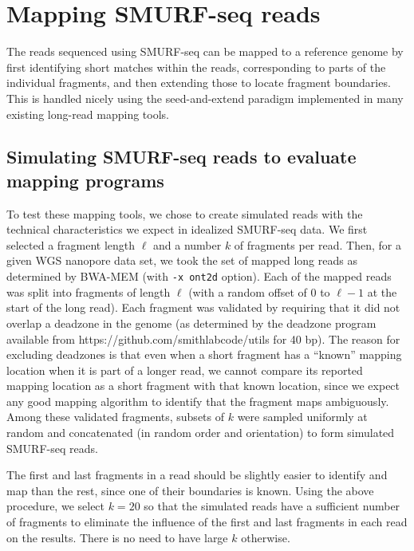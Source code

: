 \section{Mapping SMURF-seq reads}
The reads sequenced using SMURF-seq can be mapped to a reference genome
by first identifying short matches within the reads, corresponding to
parts of the individual fragments, and then extending those to locate
fragment boundaries. This is handled nicely using the seed-and-extend
paradigm implemented in many existing long-read mapping tools.


\subsection{Simulating SMURF-seq reads to evaluate mapping programs}
To test these mapping tools, we chose to create simulated reads with the
technical characteristics we expect in idealized SMURF-seq data. We
first selected a fragment length $\ell$ and a number $k$ of fragments
per read. Then, for a given WGS nanopore data set, we took the set of
mapped long reads as determined by BWA-MEM (with \texttt{-x ont2d}
option).
Each of the mapped reads was split into fragments of length $\ell$ (with
a random offset of $0$ to $\ell-1$ at the start of the long read). Each
fragment was validated by requiring that it did not overlap a deadzone
in the genome (as determined by the deadzone program available from
https://github.com/smithlabcode/utils for 40 bp). The reason for
excluding deadzones is that even when a short fragment has a ``known''
mapping location when it is part of a longer read, we cannot compare its
reported mapping location as a short fragment with that known location,
since we expect any good mapping algorithm to identify that the fragment
maps ambiguously. Among these validated fragments, subsets of $k$ were
sampled uniformly at random and concatenated (in random order and
orientation) to form simulated SMURF-seq reads.

The first and last fragments in a read should be slightly easier to
identify and map than the rest, since one of their boundaries is
known. Using the above procedure, we select $k=20$ so that the
simulated reads have a sufficient number of fragments to eliminate the
influence of the first and last fragments in each read on the
results. There is no need to have large $k$ otherwise.

